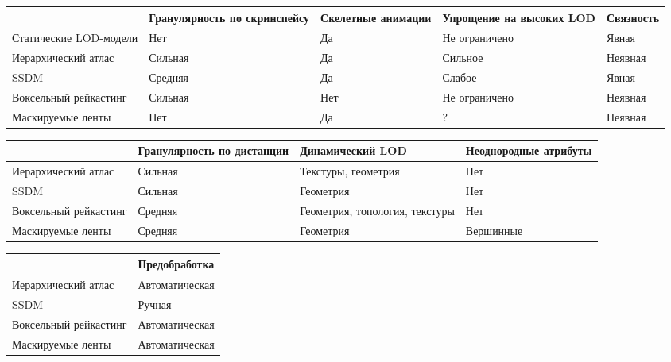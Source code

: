 \documentclass{article}
\begin{document}
\begin{center}
\begin{tabular}{ p{22mm} | p{22mm} | p{16mm} | p{22mm} | p{16mm} }
                       & Гранулярность по скринспейсу & Скелетные анимации & Упрощение на высоких LOD & Связность \\
\hline
Статические LOD-модели & Нет                          & Да                 & Не ограничено            & Явная     \\
\hline
Иерархический атлас    & Сильная                      & Да                 & Сильное                  & Неявная   \\
\hline
SSDM                   & Средняя                      & Да                 & Слабое                   & Явная     \\
\hline
Воксельный рейкастинг  & Сильная                      & Нет                & Не ограничено            & Неявная   \\
\hline
Маскируемые ленты      & Нет                          & Да                 & ?                        & Неявная   \\
\end{tabular}
\end{center}

\begin{center}
\begin{tabular}{ p{22mm} | p{22mm} | p{22mm} | p{22mm}  }
                      & Гранулярность по дистанции & Динамический LOD               & Неоднородные атрибуты \\
\hline
Иерархический атлас   & Сильная                    & Текстуры, геометрия            & Нет \\
\hline
SSDM                  & Сильная                    & Геометрия                      & Нет \\
\hline
Воксельный рейкастинг & Средняя                    & Геометрия, топология, текстуры & Нет \\
\hline
Маскируемые ленты     & Средняя                    & Геометрия                      & Вершинные \\
\end{tabular}
\end{center}

\begin{center}
\begin{tabular}{ p{22mm} | p{22mm} }
                      & Предобработка  \\
\hline
Иерархический атлас   & Автоматическая \\
\hline
SSDM                  & Ручная         \\
\hline
Воксельный рейкастинг & Автоматическая \\
\hline
Маскируемые ленты     & Автоматическая \\
\end{tabular}
\end{center}
\end{document}
